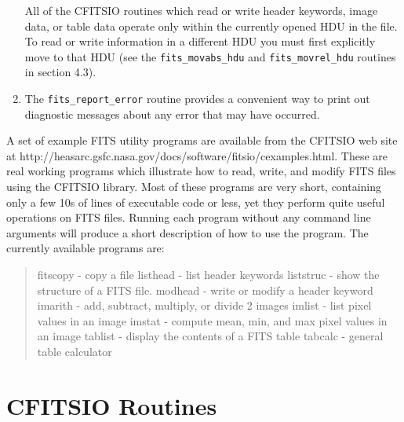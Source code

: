 \documentclass[11pt]{article}
\begin{document}
\begin{enumerate}
All of the CFITSIO routines which read or write header keywords,
image data, or table data operate only within the currently opened
HDU in the file. To read or write information in a different HDU you must
first explicitly move to that HDU (see the {\tt fits\_movabs\_hdu} and
{\tt fits\_movrel\_hdu} routines in section 4.3).

\item

The {\tt fits\_report\_error} routine provides a convenient way to print out
diagnostic messages about any error that may have occurred. 

\end{enumerate}

A set of example FITS utility programs are  available from the CFITSIO
web site at \newline
http://heasarc.gsfc.nasa.gov/docs/software/fitsio/cexamples.html.
These are real working programs which illustrate how to read, write,
and modify FITS files using the CFITSIO library.  Most of these
programs are very short, containing only a few 10s of lines of
executable code or less, yet they perform quite useful operations on
FITS files. Running each program without any command line arguments
will produce a short description of how to use the program.
The currently available programs are:
\begin{quote}
fitscopy - copy a file
\newline
listhead - list header keywords
\newline
liststruc - show the structure of a FITS file.
\newline
modhead  - write or modify a header keyword
\newline
imarith  - add, subtract, multiply, or divide 2 images
\newline
imlist  - list pixel values in an image
\newline
imstat  - compute mean, min, and max pixel values in an image
\newline
tablist - display the contents of a FITS table
\newline
tabcalc  - general table calculator
\end{quote}

\newpage

\section{CFITSIO Routines}
\end{document}
